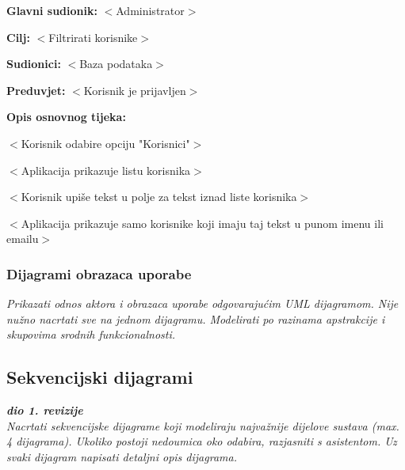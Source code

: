 					\noindent {}
					\begin{packed_item}

						\item \textbf{Glavni sudionik: }$<$Administrator$>$
						\item  \textbf{Cilj:} $<$Filtrirati korisnike$>$
						\item  \textbf{Sudionici:} $<$Baza podataka$>$
						\item  \textbf{Preduvjet:} $<$Korisnik je prijavljen$>$
						\item  \textbf{Opis osnovnog tijeka:}

						\item[] \begin{packed_enum}

							\item $<$Korisnik odabire opciju "Korisnici"$>$
							\item $<$Aplikacija prikazuje listu korisnika$>$
							\item $<$Korisnik upiše tekst u polje za tekst iznad liste korisnika$>$
							\item $<$Aplikacija prikazuje samo korisnike koji imaju taj tekst u punom imenu ili emailu$>$
						\end{packed_enum}
					\end{packed_item}
					
				\subsubsection{Dijagrami obrazaca uporabe}
					
					\textit{Prikazati odnos aktora i obrazaca uporabe odgovarajućim UML dijagramom. Nije nužno nacrtati sve na jednom dijagramu. Modelirati po razinama apstrakcije i skupovima srodnih funkcionalnosti.}
				\eject		
				
			\subsection{Sekvencijski dijagrami}
				
				\textbf{\textit{dio 1. revizije}}\\
				
				\textit{Nacrtati sekvencijske dijagrame koji modeliraju najvažnije dijelove sustava (max. 4 dijagrama). Ukoliko postoji nedoumica oko odabira, razjasniti s asistentom. Uz svaki dijagram napisati detaljni opis dijagrama.}
				\eject
	
